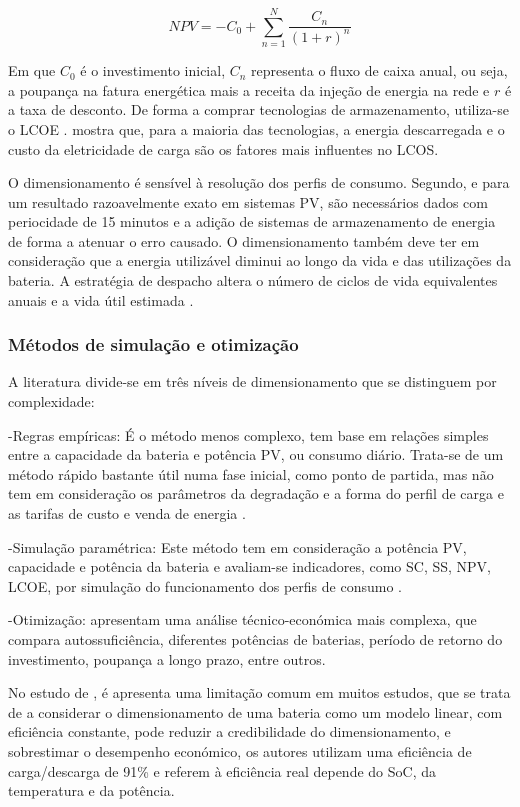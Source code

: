 \[
NPV = -C_0 + \sum_{n=1}^{N} \frac{C_n}{(1+r)^n}
\]

Em que $C_0$ é o investimento inicial, $C_n$ representa o fluxo de caixa anual, ou seja, a poupança na fatura energética mais a receita da injeção de energia na rede e $r$ é a taxa de desconto. De forma a comprar tecnologias de armazenamento, utiliza-se o LCOE \cite{Azuatalam2019}. \textcite{Jlch2016} mostra que, para a maioria das tecnologias, a energia descarregada e o custo da eletricidade de carga são os fatores mais influentes no LCOS. 

O dimensionamento é sensível à resolução dos perfis de consumo. Segundo, \textcite{Azuatalam2019} e \textcite{Beck2016} para um resultado razoavelmente exato em sistemas PV, são necessários dados com periocidade de 15 minutos e a adição de sistemas de armazenamento de energia de forma a atenuar o erro causado. 
O dimensionamento também deve ter em consideração que a energia utilizável diminui ao longo da vida e das utilizações da bateria.  A estratégia de despacho altera o número de ciclos de vida equivalentes anuais e a vida útil estimada \cite{Azuatalam2019}. 




 \subsubsection{Métodos de simulação e otimização }
\label{sec:Ch2.4.2}

A literatura divide-se em três níveis de dimensionamento que se distinguem por complexidade:

-Regras empíricas: É o método menos complexo, tem base em relações simples entre a capacidade da bateria e potência PV, ou consumo diário. Trata-se de um método rápido bastante útil numa fase inicial, como ponto de partida, mas não tem em consideração os parâmetros da degradação e a forma do perfil de carga e as tarifas de custo e venda de energia \cite{Luthander2016}.

-Simulação paramétrica: Este método tem em consideração a potência PV, capacidade e potência da bateria e avaliam-se indicadores, como SC, SS, NPV, LCOE, por simulação do funcionamento dos perfis de consumo \cite{Weniger2014}.

-Otimização: \textcite{Hesse2017} apresentam uma análise técnico-económica mais complexa, que compara autossuficiência, diferentes potências de baterias, período de retorno do investimento, poupança a longo prazo, entre outros. 

No estudo de \cite{Azuatalam2019}, é apresenta uma limitação comum em muitos estudos, que se trata de a considerar o dimensionamento de uma bateria como um modelo linear, com eficiência constante, pode reduzir a credibilidade do dimensionamento, e sobrestimar o desempenho económico, os autores utilizam uma eficiência de carga/descarga de 91\% e referem à eficiência real depende do SoC, da temperatura e da potência. 


